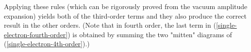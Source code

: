 Applying these rules (which can be rigorously proved from the vacuum amplitude expansion) yields both of the third-order terms and they also produce the correct result in the other orders. (Note that in fourth order, the last term in (\ref{single-electron-fourth-order}) is obtained by summing the two "mitten" diagrams of (\ref{single-electron-4th-order}).)
